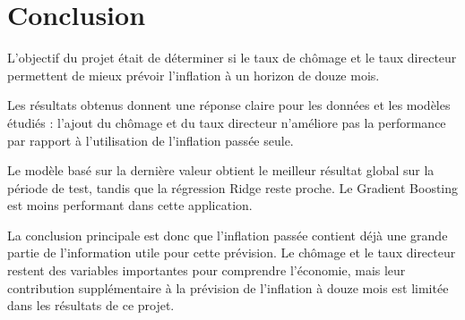 \documentclass[12pt,a4paper]{article}
\begin{document}
\section{Conclusion}

L'objectif du projet était de déterminer si le taux de chômage et le taux directeur permettent de mieux prévoir l'inflation à un horizon de douze mois.

Les résultats obtenus donnent une réponse claire pour les données et les modèles étudiés : l'ajout du chômage et du taux directeur n'améliore pas la performance par rapport à l'utilisation de l'inflation passée seule.

Le modèle basé sur la dernière valeur obtient le meilleur résultat global sur la période de test, tandis que la régression Ridge reste proche. Le Gradient Boosting est moins performant dans cette application.

La conclusion principale est donc que l'inflation passée contient déjà une grande partie de l'information utile pour cette prévision. Le chômage et le taux directeur restent des variables importantes pour comprendre l'économie, mais leur contribution supplémentaire à la prévision de l'inflation à douze mois est limitée dans les résultats de ce projet.
\end{document}
